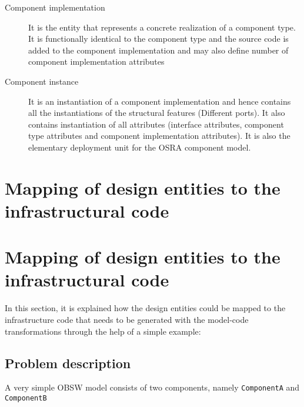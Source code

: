 \begin{description}
\item [Component implementation] It is the entity that represents a concrete realization of a component type. It is functionally identical to the component type and the source code is added to the component implementation and may also define number of component implementation attributes

\item [Component instance] It is an instantiation of a component implementation and hence contains all the instantiations of the structural features (Different ports). It also contains instantiation of all attributes (interface attributes, component type attributes and component implementation attributes). It is also the elementary deployment unit for the OSRA component model.        
\end{description}

\section{Mapping of design entities to the infrastructural code}


\section{Mapping of design entities to the infrastructural code}    
In this section, it is explained how the design entities could be mapped to the infrastructure code that needs to be generated with the model-code transformations through the help of a simple example:

\subsection{Problem description}
A very simple OBSW model consists of two components, namely \texttt{ComponentA} and \texttt{ComponentB} 


